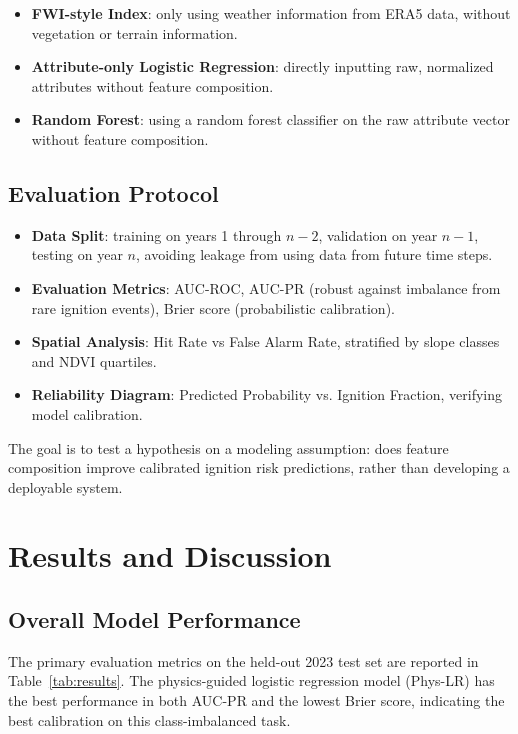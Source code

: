 \documentclass[conference]{IEEEtran}
\begin{document}
\begin{itemize}
\item \textbf{FWI-style Index}: only using weather information from ERA5 data, without vegetation or terrain information.
\item \textbf{Attribute-only Logistic Regression}: directly inputting raw, normalized attributes without feature composition.
\item \textbf{Random Forest}: using a random forest classifier on the raw attribute vector without feature composition.
\end{itemize}

\subsection{Evaluation Protocol}

\begin{itemize}
\item \textbf{Data Split}: training on years 1 through $n-2$, validation on year $n-1$, testing on year $n$, avoiding leakage from using data from future time steps.
\item \textbf{Evaluation Metrics}: AUC-ROC, AUC-PR (robust against imbalance from rare ignition events), Brier score (probabilistic calibration).
\item \textbf{Spatial Analysis}: Hit Rate vs False Alarm Rate, stratified by slope classes and NDVI quartiles.
\item \textbf{Reliability Diagram}: Predicted Probability vs. Ignition Fraction, verifying model calibration.
\end{itemize}

The goal is to test a hypothesis on a modeling assumption: does feature composition improve calibrated ignition risk predictions, rather than developing a deployable system.

\section{Results and Discussion}

\subsection{Overall Model Performance}

The primary evaluation metrics on the held-out 2023 test set are reported in Table~\ref{tab:results}. The physics-guided logistic regression model (Phys-LR) has the best performance in both AUC-PR and the lowest Brier score, indicating the best calibration on this class-imbalanced task.
\end{document}
